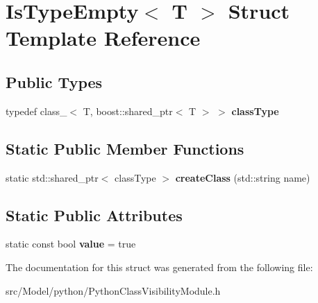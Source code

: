 \hypertarget{structIsTypeEmpty_3_01T_01_4}{}\section{Is\+Type\+Empty$<$ T $>$ Struct Template Reference}
\label{structIsTypeEmpty_3_01T_01_4}
\subsection*{Public Types}
\begin{DoxyCompactItemize}
\item 
typedef class\+\_\+$<$ T, boost\+::shared\+\_\+ptr$<$ T $>$ $>$ {\bfseries class\+Type}\hypertarget{structIsTypeEmpty_3_01T_01_4_a15bd956ee8feedfdf59b50578c40eb55}{}\label{structIsTypeEmpty_3_01T_01_4_a15bd956ee8feedfdf59b50578c40eb55}

\end{DoxyCompactItemize}
\subsection*{Static Public Member Functions}
\begin{DoxyCompactItemize}
\item 
static std\+::shared\+\_\+ptr$<$ class\+Type $>$ {\bfseries create\+Class} (std\+::string name)\hypertarget{structIsTypeEmpty_3_01T_01_4_a909aa6a84a51e1b3b1a768edc86c4c42}{}\label{structIsTypeEmpty_3_01T_01_4_a909aa6a84a51e1b3b1a768edc86c4c42}

\end{DoxyCompactItemize}
\subsection*{Static Public Attributes}
\begin{DoxyCompactItemize}
\item 
static const bool {\bfseries value} = true\hypertarget{structIsTypeEmpty_3_01T_01_4_aa0cba789b0911b7d6b02e668077ea63d}{}\label{structIsTypeEmpty_3_01T_01_4_aa0cba789b0911b7d6b02e668077ea63d}

\end{DoxyCompactItemize}


The documentation for this struct was generated from the following file\+:\begin{DoxyCompactItemize}
\item 
src/\+Model/python/Python\+Class\+Visibility\+Module.\+h\end{DoxyCompactItemize}
